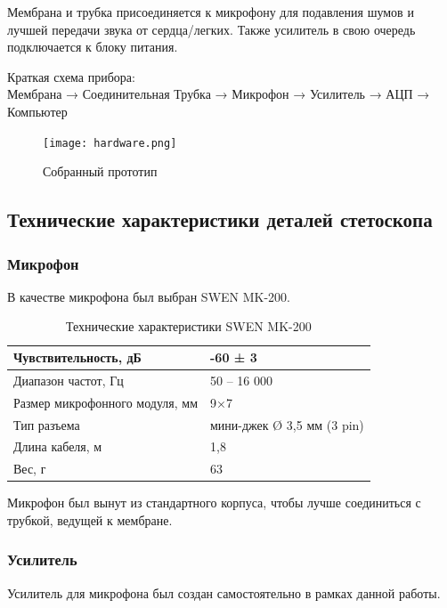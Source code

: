 Мембрана и трубка присоединяется к микрофону для подавления шумов и лучшей передачи звука от сердца/легких. Также усилитель в свою очередь подключается к блоку питания.

\begin{center}
Краткая схема прибора:\\
\noindent\small{{Мембрана → Соединительная Трубка → Микрофон → Усилитель → АЦП → Компьютер}}
\end{center}

\begin{figure}[H]
\centering
\texttt{[image: hardware.png]}
\caption{Собранный прототип}
\end{figure}

\subsection{Технические характеристики деталей стетоскопа}
\subsubsection{Микрофон}
В качестве микрофона был выбран SWEN MK-200. \\

\begin{table}[h]
\centering
\label{my-label}
\begin{tabular}{|l|l|}
\hline
Чувствительность, дБ           & -60 ± 3                    \\ \hline
Диапазон частот, Гц            & 50 – 16 000                \\ \hline
Размер микрофонного модуля, мм & 9×7                        \\ \hline
Тип разъема                    & мини-джек Ø 3,5 мм (3 pin) \\ \hline
Длина кабеля, м                & 1,8                        \\ \hline
Вес, г                         & 63                         \\ \hline
\end{tabular}
\caption{Технические характеристики SWEN MK-200}
\end{table}

Микрофон был вынут из стандартного корпуса, чтобы лучше соединиться с трубкой, ведущей к мембране.

\subsubsection{Усилитель}
Усилитель для микрофона был создан самостоятельно в рамках данной работы.

